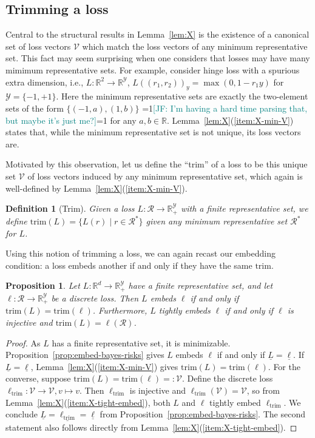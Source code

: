 \documentclass[11pt]{article}
\newcommand{\Comments}{1}
\newcommand{\mynote}[2]{\ifnum\Comments=1\textcolor{#1}{#2}\fi}
\newcommand{\mytodo}[2]{\ifnum\Comments=1%
  \todo[linecolor=#1!80!black,backgroundcolor=#1,bordercolor=#1!80!black]{#2}\fi}
\newcommand{\raft}[1]{\mytodo{green!20!white}{RF: #1}}
\newcommand{\jessie}[1]{\mynote{teal}{[JF: #1]}}
\newcommand{\reals}{\mathbb{R}}
\newcommand{\R}{\mathcal{R}}
\newcommand{\V}{\mathcal{V}}
\newcommand{\Y}{\mathcal{Y}}
\newcommand{\risk}[1]{\underline{#1}}
\newcommand{\trim}{\mathrm{trim}}
\newcommand{\trimcover}{\mathrm{trim}}
\newtheorem{proposition}{Proposition}
\newtheorem{definition}{Definition}
\begin{document}
\subsection{Trimming a loss}

Central to the structural results in Lemma~\ref{lem:X} is the existence of a canonical set of loss vectors $\V$ which match the loss vectors of any minimum representative set.
This fact may seem surprising when one considers that losses may have many mimimum representative sets.
For example, consider hinge loss with a spurious extra dimension, i.e., $L:\reals^2\to\reals^\Y$, $L((r_1, r_2))_y = \max(0,1-r_1y)$ for $\Y = \{-1,+1\}$.
Here the minimum representative sets are exactly the two-element sets of the form $\{(-1,a),(1,b)\}$ \jessie{I'm having a hard time parsing that, but maybe it's just me?}\raft{better?} for any $a,b\in\reals$. 
Lemma~\ref{lem:X}(\ref{item:X-min-V}) states that, while the minimum representative set is not unique, its loss vectors are.

Motivated by this observation, let us define the ``trim'' of a loss to be this unique set $\V$ of loss vectors induced by any minimum representative set, which again is well-defined by Lemma~\ref{lem:X}(\ref{item:X-min-V}).
\begin{definition}[Trim]\label{def:trim-loss}
  Given a loss $L:\R \to \reals_+^\Y$ with a finite representative set, we define $\trimcover(L) = \{L(r) \mid r \in \R^*\}$ given any minimum representative set $\R^*$ for $L$.
\end{definition}


Using this notion of trimming a loss, we can again recast our embedding condition: a loss embeds another if and only if they have the same $\trimcover$.

\begin{proposition}\label{prop:embed-iff-trims-equal}
  Let $L:\reals^d\to\reals^\Y_+$ have a finite representative set, and let $\ell:\R\to\reals^\Y_+$ be a discrete loss.
  Then $L$ embeds $\ell$ if and only if $\trimcover(L) = \trimcover(\ell)$.
  Furthermore, $L$ tightly embeds $\ell$ if and only if $\ell$ is injective and $\trimcover(L) = \ell(\R)$.
\end{proposition}
\begin{proof}
  As $L$ has a finite representative set, it is minimizable.
  Proposition~\ref{prop:embed-bayes-risks} gives $L$ embeds $\ell$ if and only if $\risk L = \risk \ell$.
  If $\risk L = \risk \ell$, Lemma~\ref{lem:X}(\ref{item:X-min-V}) gives $\trim(L) = \trim(\ell)$.
  For the converse, suppose $\trim(L) = \trim(\ell) =: \V$.
  Define the discrete loss $\ell_\trim : \V \to \V, v\mapsto v$.
  Then $\ell_\trim$ is injective and $\ell_\trim(\V) = \V$, so from Lemma~\ref{lem:X}(\ref{item:X-tight-embed}), both $L$ and $\ell$ tightly embed $\ell_\trim$.
  We conclude $\risk L = \risk{\ell_\trim} = \risk \ell$ from Proposition~\ref{prop:embed-bayes-risks}.
  The second statement also follows directly from Lemma~\ref{lem:X}(\ref{item:X-tight-embed}).
\end{proof}
\end{document}
